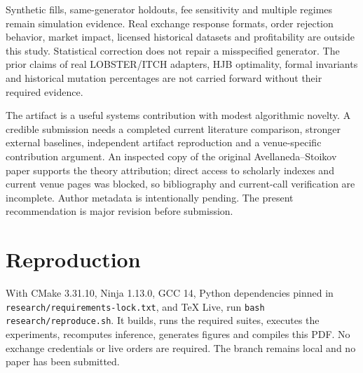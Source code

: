 \documentclass[conference]{IEEEtran}
\begin{document}
Synthetic fills, same-generator holdouts, fee sensitivity and multiple regimes remain simulation evidence. Real exchange response formats, order rejection behavior, market impact, licensed historical datasets and profitability are outside this study. Statistical correction does not repair a misspecified generator. The prior claims of real LOBSTER/ITCH adapters, HJB optimality, formal invariants and historical mutation percentages are not carried forward without their required evidence.

The artifact is a useful systems contribution with modest algorithmic novelty. A credible submission needs a completed current literature comparison, stronger external baselines, independent artifact reproduction and a venue-specific contribution argument. An inspected copy of the original Avellaneda--Stoikov paper supports the theory attribution; direct access to scholarly indexes and current venue pages was blocked, so bibliography and current-call verification are incomplete. Author metadata is intentionally pending. The present recommendation is major revision before submission.

\section{Reproduction}
With CMake 3.31.10, Ninja 1.13.0, GCC 14, Python dependencies pinned in \texttt{research/requirements-lock.txt}, and TeX Live, run \texttt{bash research/reproduce.sh}. It builds, runs the required suites, executes the experiments, recomputes inference, generates figures and compiles this PDF. No exchange credentials or live orders are required. The branch remains local and no paper has been submitted.

\end{document}

